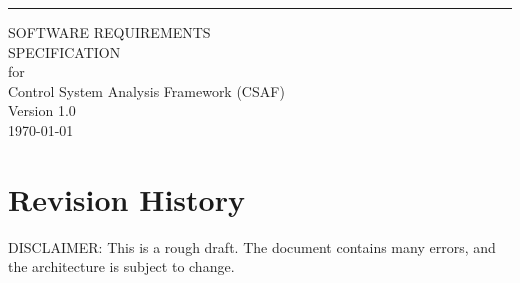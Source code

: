 \documentclass{scrreprt}
\date{}
\def\myversion{1.0 }
\begin{document}
\begin{flushright}
    \rule{16cm}{5pt}\vskip1cm
    \begin{bfseries}
        \Huge{SOFTWARE REQUIREMENTS\\ SPECIFICATION}\\
        \vspace{1.9cm}
        for\\
        \vspace{1.9cm}
        Control System Analysis Framework (CSAF)\\
        \vspace{1.9cm}
        \LARGE{Version \myversion}\\
        \vspace{1.9cm}
        \vspace{1.9cm}
        \vspace{1.9cm}
        \today\\
    \end{bfseries}
\end{flushright}

\tableofcontents


\chapter*{Revision History}

DISCLAIMER: This is a rough draft. The document contains many errors, and the architecture is subject to change.















\printnoidxglossary[type=\acronymtype]
\end{document}
